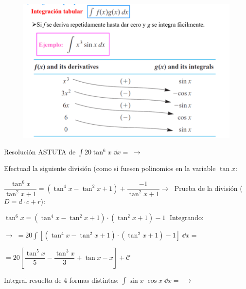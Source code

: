{\begin{figure}[H]
		\centering
		\includegraphics[width=1\textwidth]{imagenes/imagenes07/T07IM04.png}
	\end{figure}

\vspace{3mm}

\begin{ejre}
	
	Resolución ASTUTA de $\displaystyle \int 20 \tan^6 x \; \dd x = \; \to \; $
\end{ejre}

\begin{proofw}\renewcommand{\qedsymbol}{$\diamond$}	 

Efectuad la siguiente división (como si fuesen polinomios en la variable $\tan x$:

$\dfrac {\tan^6 x}{\tan^2 x + 1}= (\tan^4 x- \tan^2 x + 1) + \dfrac {-1}{\tan^2 x + 1} \to \; $  Prueba de la división ($D=d\cdot c+r$):

$\tan^6 x=  (\tan^4 x- \tan^2 x + 1)\cdot (\tan^2 x + 1) - 1\; $ Integrando:

\vspace{3mm}

\vspace{3mm}

$\to \; = \displaystyle 20 \int \left[  (\tan^4 x- \tan^2 x + 1)\cdot (\tan^2 x + 1) - 1 \right] \; \dd x =$

$=\displaystyle 20 \left[ \dfrac {\tan^5 x}{5} - \dfrac {\tan^3 x}{3} + \tan x -x  \right] + \mathcal C$
	
\end{proofw}

\begin{ejre}
	Integral resuelta de 4 formas distintas: $\displaystyle \int \sin x \; \cos x \; \dd x = \; \to $
\end{ejre}

}
